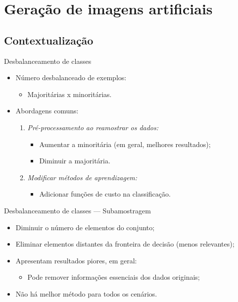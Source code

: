 \documentclass[10pt]{beamer}
\begin{document}
\section{Geração de imagens artificiais}
\subsection{Contextualização}
\begin{frame}{Desbalanceamento de classes}
  \setlength\leftmargini{1em}
  \begin{itemize}
    \item Número desbalanceado de exemplos:
      \begin{itemize}
        \item Majoritárias x minoritárias.
      \end{itemize}
    \item Abordagens comuns:
    \begin{enumerate}
      \item \emph{Pré-processamento ao reamostrar os dados:}
      \begin{itemize}
        \item Aumentar a minoritária (em geral, melhores resultados);
        \item Diminuir a majoritária.
      \end{itemize}
      \item \emph{Modificar métodos de aprendizagem:}
      \begin{itemize}
        \item Adicionar funções de custo na classificação.
      \end{itemize}
    \end{enumerate}
  \end{itemize}
\end{frame}
\begin{frame}{Desbalanceamento de classes --- Subamostragem}
  \setlength\leftmargini{1em}
    \begin{itemize}
    \item Diminuir o número de elementos do conjunto;
    \item Eliminar elementos distantes da fronteira de decisão (menos relevantes);
    \item Apresentam resultados piores, em geral:
    \begin{itemize}
      \item Pode remover informações essenciais dos dados originais;
    \end{itemize}
    \item Não há melhor método para todos os cenários.
  \end{itemize}
\end{frame}
\end{document}
